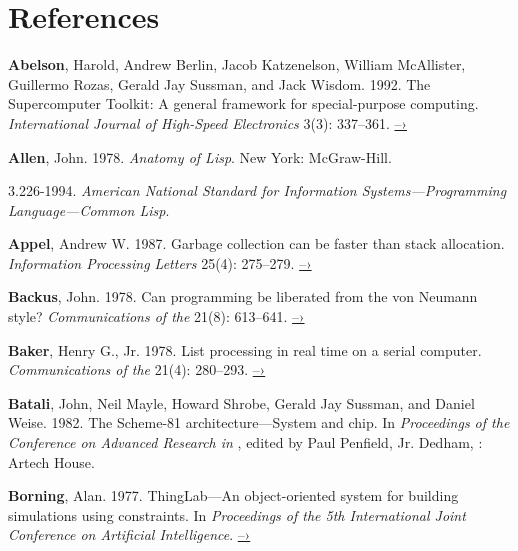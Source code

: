 \chapter*{References}
\label{References}


 \label{Abelson et al. 1992}
\textbf{Abelson}, Harold, Andrew Berlin, Jacob Katzenelson, William McAllister,
Guillermo Rozas, Gerald Jay Sussman, and Jack Wisdom. 1992.  The Supercomputer
Toolkit: A general framework for special-purpose computing.
\textit{International Journal of High-Speed Electronics} 3(3): 337--361.
\href{http://www.hpl.hp.com/techreports/94/HPL-94-30.html}{–›}

 \label{Allen 1978}
\textbf{Allen}, John.  1978.  \textit{Anatomy of Lisp}. New York: McGraw-Hill.

 \label{ANSI 1994}
 3.226-1994. \textit{American National Standard for Information
Sys\-tems---Programming Language---Common Lisp}.

 \label{Appel 1987}
\textbf{Appel}, Andrew W.  1987.  Garbage collection can be faster than stack
allocation.  \textit{Information Processing Letters} 25(4): 275--279.
\href{https://www.cs.princeton.edu/~appel/papers/45.ps}{–›}

 \label{Backus 1978}
\textbf{Backus}, John.  1978.  Can programming be liberated from the von Neumann style?
\textit{Communications of the } 21(8): 613--641.
\href{http://worrydream.com/refs/Backus-CanProgrammingBeLiberated.pdf}{–›}

 \label{Baker (1978)}
\textbf{Baker}, Henry G., Jr.  1978.  List processing in real time on a serial computer.
\textit{Communications of the } 21(4): 280--293.
\href{http://dspace.mit.edu/handle/1721.1/41976}{–›}

 \label{Batali et al. 1982}
\textbf{Batali}, John, Neil Mayle, Howard Shrobe, Gerald Jay Sussman, and Daniel Weise.
1982.  The Scheme-81 architecture---System and chip.  In \textit{Proceedings of
the  Conference on Advanced Research in }, edited by
Paul Penfield, Jr. Dedham, : Artech House.

 \label{Borning (1977)}
\textbf{Borning}, Alan.  1977.  ThingLab---An object-oriented system for building
simulations using constraints. In \textit{Proceedings of the 5th International
Joint Conference on Artificial Intelligence}.
\href{http://ijcai.org/Past\%20Proceedings/IJCAI-77-VOL1/PDF/085.pdf}{–›}

